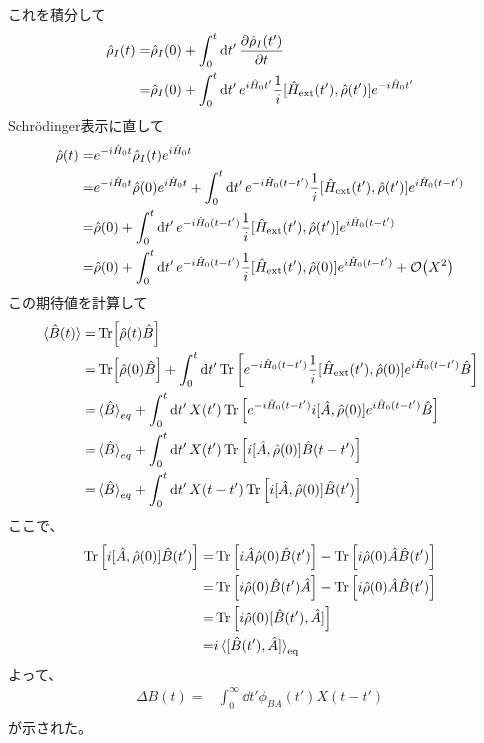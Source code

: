 \documentclass{ltjsarticle}
\begin{document}
これを積分して
\begin{align}
  \hat{\rho}_I(t)=&\hat{\rho}_I(0)+\int_0^t\dd{t'}\pdv{\hat{\rho}_I(t')}{t}\\
  =&\hat{\rho}_I(0)+\int_0^t\dd{t'}e^{i\hat{H}_0t'}\frac{1}{i}[\hat{H}_{\textrm{ext}}(t'),\hat{\rho}(t')]e^{-i\hat{H}_0t'}\\
\end{align}
Schrödinger表示に直して
\begin{align}
  \hat{\rho}(t)=&e^{-i\hat{H}_0t}\hat{\rho}_I(t)e^{i\hat{H}_0t}\\
  =&e^{-i\hat{H}_0t}\hat{\rho}(0)e^{i\hat{H}_0t}+\int_0^t\dd{t'}e^{-i\hat{H}_0(t-t')}\frac{1}{i}[\hat{H}_{\textrm{ext}}(t'),\hat{\rho}(t')]e^{i\hat{H}_0(t-t')}\\
  =&\hat{\rho}(0)+\int_0^t\dd{t'}e^{-i\hat{H}_0(t-t')}\frac{1}{i}[\hat{H}_{\textrm{ext}}(t'),\hat{\rho}(t')]e^{i\hat{H}_0(t-t')}\\
  =&\hat{\rho}(0)+\int_0^t\dd{t'}e^{-i\hat{H}_0(t-t')}\frac{1}{i}[\hat{H}_{\textrm{ext}}(t'),\hat{\rho}(0)]e^{i\hat{H}_0(t-t')}+\order{X^2}\\
\end{align}
この期待値を計算して
\begin{align}
  \ev*{\hat{B}(t)}=&\Tr[\hat{\rho}(t)\hat{B}]\\
  =&\Tr[\hat{\rho}(0)\hat{B}]+\int_0^t\dd{t'}\Tr\left[e^{-i\hat{H}_0(t-t')}\frac{1}{i}[\hat{H}_{\textrm{ext}}(t'),\hat{\rho}(0)]e^{i\hat{H}_0(t-t')}\hat{B}\right]\\
  =&\ev*{\hat{B}}_{eq}+\int_0^t\dd{t'}X(t')\Tr\left[e^{-i\hat{H}_0(t-t')}i[\hat{A},\hat{\rho}(0)]e^{i\hat{H}_0(t-t')}\hat{B}\right]\\
  =&\ev*{\hat{B}}_{eq}+\int_0^t\dd{t'}X(t')\Tr\left[i[\hat{A},\hat{\rho}(0)]\hat{B}(t-t')\right]\\
  =&\ev*{\hat{B}}_{eq}+\int_0^t\dd{t'}X(t-t')\Tr\left[i[\hat{A},\hat{\rho}(0)]\hat{B}(t')\right]\\
\end{align}
ここで、
\begin{align}
  \Tr\left[i[\hat{A},\hat{\rho}(0)]\hat{B}(t')\right]
  =&\Tr\left[i\hat{A}\hat{\rho}(0)\hat{B}(t')\right]-\Tr\left[i\hat{\rho}(0)\hat{A}\hat{B}(t')\right]\\
  =&\Tr\left[i\hat{\rho}(0)\hat{B}(t')\hat{A}\right]-\Tr\left[i\hat{\rho}(0)\hat{A}\hat{B}(t')\right]\\
  =&\Tr\left[i\hat{\rho}(0)[\hat{B}(t'),\hat{A}]\right]\\
  =&i\ev*{[\hat{B}(t'),\hat{A}]}_{\textrm{eq}}
\end{align}
よって、
\begin{align}
  \Delta B(t)=&\int^\infty_0\dd{t'}\phi_{BA}(t')X(t-t')\\
\end{align}
が示された。
\end{document}
